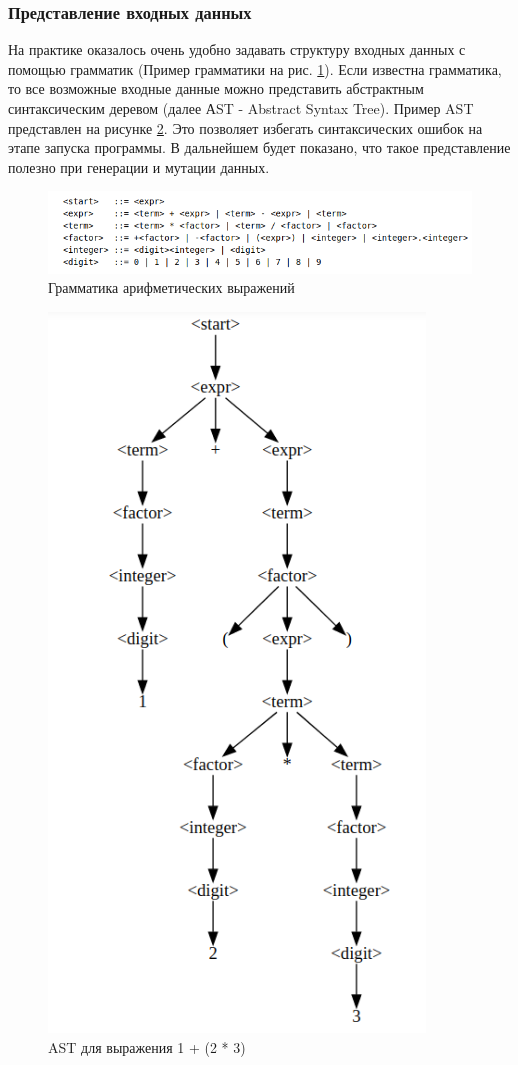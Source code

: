 \documentclass[a4paper]{article}
\begin{document}
\subsubsection{Представление входных данных}
\indent

На практике оказалось очень удобно задавать структуру входных данных с помощью грамматик (Пример грамматики на рис. \ref{SimpleGrammar}). Если известна грамматика, то все возможные входные данные можно представить абстрактным синтаксическим деревом (далее АST - Abstract Syntax Tree). Пример AST представлен на рисунке \ref{SimpleAST}. Это позволяет избегать синтаксических ошибок на этапе запуска программы. В дальнейшем будет показано, что такое представление полезно при генерации и мутации данных.

\begin{figure}[ht!]
\includegraphics[width=180mm]{Expressions_Grammar.png}
\caption{Грамматика арифметических выражений}
\label{SimpleGrammar}
\end{figure}

\begin{figure}[ht!]
\includegraphics[width=100mm]{SimpleAST.png}
\caption{AST для выражения 1 + (2 * 3)}
\label{SimpleAST}
\end{figure}
\end{document}
